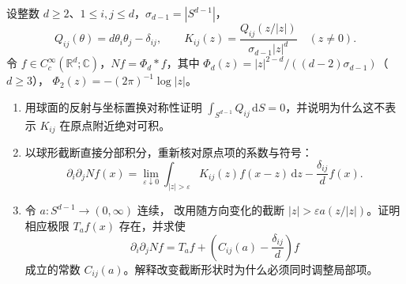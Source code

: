 \begin{optionalexercise}\label{b2:ex:13-hessian-cancellation}
设整数 \(d\geq2\)、\(1\leq i,j\leq d\)，\(\sigma_{d-1}=|S^{d-1}|\)，
\[
 Q_{ij}(\theta)=d\theta_i\theta_j-\delta_{ij},\qquad
 K_{ij}(z)=\frac{Q_{ij}(z/|z|)}{\sigma_{d-1}|z|^d}\quad(z\ne0).
\]
令 \(f\in C_c^\infty(\mathbb R^d;\mathbb C)\)，\(Nf=\Phi_d*f\)，其中
\(\Phi_d(z)=|z|^{2-d}/((d-2)\sigma_{d-1})\)（\(d\geq3\)），
\(\Phi_2(z)=-(2\pi)^{-1}\log|z|\)。
\begin{enumerate}
\item\label{b2:item:13-cancel-average}用球面的反射与坐标置换对称性证明
\(\int_{S^{d-1}}Q_{ij}\,\mathrm{d}S=0\)，并说明为什么这不表示
\(K_{ij}\) 在原点附近绝对可积。
\item\label{b2:item:13-cancel-ball}以球形截断直接分部积分，重新核对原点项的系数与符号：
\[
 \partial_i\partial_jNf(x)
 =\lim_{\varepsilon\downarrow0}\int_{|z|>\varepsilon}
       K_{ij}(z)f(x-z)\,\mathrm{d}z-\frac{\delta_{ij}}d f(x).
\]
\item\label{b2:item:13-cancel-shape}令 \(a:S^{d-1}\to(0,\infty)\) 连续，
改用随方向变化的截断 \( |z|>\varepsilon a(z/|z|)\)。证明相应极限
\(T_af(x)\) 存在，并求使
\[
 \partial_i\partial_jNf
 =T_af+\left(C_{ij}(a)-\frac{\delta_{ij}}d\right)f
\]
成立的常数 \(C_{ij}(a)\)。解释改变截断形状时为什么必须同时调整局部项。
\end{enumerate}
\end{optionalexercise}
